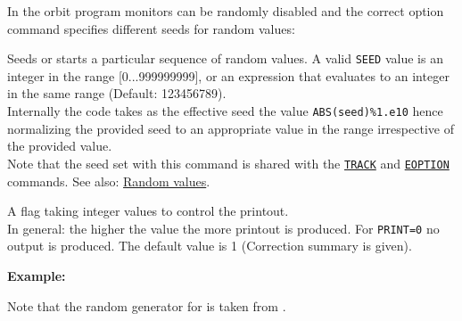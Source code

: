 
In the orbit program monitors can be randomly disabled and the correct
option command specifies different seeds for random values:  

\begin{madlist}
    Seeds or starts a particular sequence of random values. 
   A valid \texttt{SEED} value is an integer in the range [0...999999999], or
   an expression that evaluates to an integer in the same range 
   (Default: 123456789).\\
   Internally the code takes as the effective seed the value
   \texttt{ABS(seed)\%1.e10} hence normalizing the provided seed to an
   appropriate value in the range irrespective of the provided value. \\
   Note that the seed set with this command is shared with the
   \hyperref[sec:track]{\texttt{TRACK}}  and
   \hyperref[sec:eoption]{\texttt{EOPTION}}  commands.
   See also: \hyperref[subsubsec:random]{Random values}.
     
    A flag taking integer values to control the printout. 
     \\ In general: the higher the value the more printout is produced.  
     For \texttt{PRINT=0} no output is produced. 
     The default value is 1 (Correction summary is given). 
\end{madlist}

\textbf{Example:}

Note that the random generator for \mad is taken from \cite{knuth1981}.

